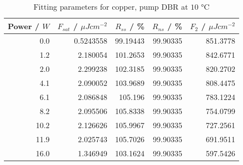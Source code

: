 \begin{table}[H]
\caption{Fitting parameters for copper, pump DBR at $10$ °C}
\begin{tabular}{rrrrr}
\toprule
Power / $W$ & $F_{sat}$ / $\mu Jcm^{-2}$ & $R_{ss}$ / \% & $R_{ns}$ / \% & $F_2$ / $\mu Jcm^{-2}$ \\
\midrule
0.0 & 0.5243558 & 99.19443 & 99.90335 & 851.3778 \\
1.2 & 2.180054 & 101.2653 & 99.90335 & 842.6771 \\
2.0 & 2.299238 & 102.3185 & 99.90335 & 820.2702 \\
4.1 & 2.090052 & 103.9689 & 99.90335 & 808.4475 \\
6.1 & 2.086848 & 105.196 & 99.90335 & 783.1224 \\
8.2 & 2.095506 & 105.8338 & 99.90335 & 754.0799 \\
10.2 & 2.126626 & 105.9967 & 99.90335 & 727.2561 \\
11.9 & 2.025743 & 105.7026 & 99.90335 & 691.9511 \\
16.0 & 1.346949 & 103.1624 & 99.90335 & 597.5426 \\
\bottomrule
\end{tabular}
\end{table}
